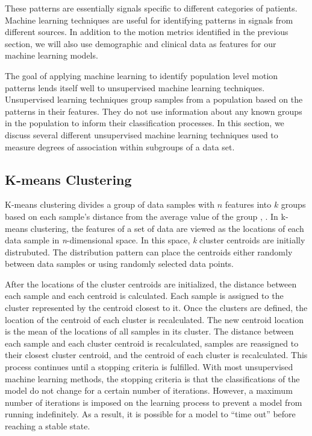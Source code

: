 These patterns are essentially signals specific to different categories of patients. Machine learning techniques are useful for identifying patterns in signals from different sources. In addition to the motion metrics identified in the previous section, we will also use demographic and clinical data as features for our machine learning models. 

The goal of applying machine learning to identify population level motion patterns lends itself well to unsupervised machine learning techniques. Unsupervised learning techniques group samples from a population based on the patterns in their features. They do not use information about any known groups in the population to inform their classification processes. In this section, we discuss several different unsupervised machine learning techniques used to measure degrees of association within subgroups of a data set.

\subsection{K-means Clustering}

K-means clustering divides a group of data samples with $n$ features into $k$ groups based on each sample's distance from the average value of the group \cite{Hartigan1979}, \cite{macqueen1967}. In k-means clustering, the features of a set of data are viewed as the locations of each data sample in \textit{n}-dimensional space. In this space, \textit{k} cluster centroids are initially distrubuted. The distribution pattern can place the centroids either randomly between data samples or using randomly selected data points.

After the locations of the cluster centroids are initialized, the distance between each sample and each centroid is calculated. Each sample is assigned to the cluster represented by the centroid closest to it. Once the clusters are defined, the location of the centroid of each cluster is recalculated. The new centroid location is the mean of the locations of all samples in its cluster. The distance between each sample and each cluster centroid is recalculated, samples are reassigned to their closest cluster centroid, and the centroid of each cluster is recalculated. This process continues until a stopping criteria is fulfilled. With most unsupervised machine learning methods, the stopping criteria is that the classifications of the model do not change for a certain number of iterations. However, a maximum number of iterations is imposed on the learning process to prevent a model from running indefinitely. As a result, it is possible for a model to ``time out'' before reaching a stable state.

